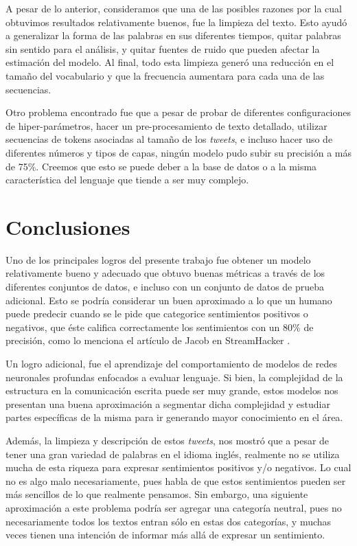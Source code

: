 \documentclass[sigconf, nonacm, spanish]{acmart}
\begin{document}
A pesar de lo anterior, consideramos que una de las posibles razones por la cual obtuvimos resultados relativamente buenos, fue la limpieza del texto. Esto ayudó a generalizar la forma de las palabras en sus diferentes tiempos, quitar palabras sin sentido para el análisis, y quitar fuentes de ruido que pueden afectar la estimación del modelo. Al final, todo esta limpieza generó una reducción en el tamaño del vocabulario y que la frecuencia aumentara para cada una de las secuencias. 

Otro problema encontrado fue que a pesar de probar de diferentes configuraciones de hiper-parámetros, hacer un pre-procesamiento de texto detallado, utilizar secuencias de tokens asociadas al tamaño de los \textit{tweets}, e incluso hacer uso de diferentes números y tipos de capas, ningún modelo pudo subir su precisión a más de 75\%. Creemos que esto se puede deber a la base de datos o a la misma característica del lenguaje que tiende a ser muy complejo. 

\section{Conclusiones}

Uno de los principales logros del presente trabajo fue obtener un modelo relativamente bueno y adecuado que obtuvo buenas métricas a través de los diferentes conjuntos de datos, e incluso con un conjunto de datos de prueba adicional. Esto se podría considerar un buen aproximado a lo que un humano puede predecir cuando se le pide que categorice sentimientos positivos o negativos, que éste califica correctamente los sentimientos con un 80\% de precisión, como lo menciona el artículo de Jacob en StreamHacker \cite{Jacob}. 

Un logro adicional, fue el aprendizaje del comportamiento de modelos de redes neuronales profundas enfocados a evaluar lenguaje. Si bien, la complejidad de la estructura en la comunicación escrita puede ser muy grande, estos modelos nos presentan una buena aproximación a segmentar dicha complejidad y estudiar partes específicas de la misma para ir generando mayor conocimiento en el área.

Además, la limpieza y descripción de estos \textit{tweets}, nos mostró que a pesar de tener una gran variedad de palabras en el idioma inglés, realmente no se utiliza mucha de esta riqueza para expresar sentimientos positivos y/o negativos. Lo cual no es algo malo necesariamente, pues habla de que estos sentimientos pueden ser más sencillos de lo que realmente pensamos. Sin embargo, una siguiente aproximación a este problema podría ser agregar una categoría neutral, pues no necesariamente todos los textos entran sólo en estas dos categorías, y muchas veces tienen una intención de informar más allá de expresar un sentimiento.
\end{document}
